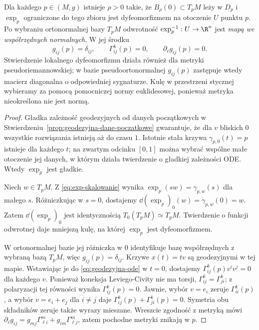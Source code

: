 \begin{twierdzenie}
\label{thm:wspolrzedne-normalne}
Dla każdego $p\in(M,g)$ istnieje $\rho>0$
takie, że $B_\rho(0)\subset T_pM$ leży w $D_p$
i $\exp_p$ ograniczone do tego zbioru jest
dyfeomorfizmem na otoczenie $U$ punktu $p$.
Po wybraniu ortonormalnej bazy $T_pM$
odwrotność $\exp_p^{-1}:U\to\R^n$ jest
\emph{mapą we współrzędnych normalnych}.
W jej środku
\begin{equation}\label{eq:normalne-metryka}
 g_{ij}(p)=\delta_{ij},\qquad
 \Gamma^k_{ij}(p)=0,\qquad
 \partial_\ell g_{ij}(p)=0.
\end{equation}
Stwierdzenie lokalnego dyfeomorfizmu działa
również dla metryki pseudoriemannowskiej;
w bazie pseudoortonormalnej $g_{ij}(p)$ zastępuje wtedy
macierz diagonalna o odpowiedniej sygnaturze. Kulę
w przestrzeni stycznej wybieramy za pomocą pomocniczej
normy euklidesowej, ponieważ metryka nieokreślona nie jest normą.
\end{twierdzenie}
\begin{proof}
Gładka zależność geodezyjnych od danych
początkowych w Stwierdzeniu~\ref{prop:geodezyjna-dane-poczatkowe}
gwarantuje, że dla $v$ bliskich $0$ wszystkie
rozwiązania istnieją aż do czasu $1$.
Istotnie stała krzywa $\gamma_{p,0}(t)=p$
istnieje dla każdego $t$; na zwartym odcinku
$[0,1]$ można wybrać wspólne małe otoczenie
jej danych, w którym działa twierdzenie o gładkiej
zależności ODE. Wtedy $\exp_p$ jest gładkie.

Niech $w\in T_pM$. Z \eqref{eq:exp-skalowanie}
wynika $\exp_p(sw)=\gamma_{p,w}(s)$ dla małego $s$.
Różniczkując w $s=0$, dostajemy
$\dd(\exp_p)_0(w)=\dot\gamma_{p,w}(0)=w$.
Zatem $\dd(\exp_p)_0$ jest identycznością
$T_0(T_pM)\simeq T_pM$. Twierdzenie o funkcji
odwrotnej daje mniejszą kulę, na której
$\exp_p$ jest dyfeomorfizmem.

W ortonormalnej bazie jej różniczka w $0$
identyfikuje bazę współrzędnych z wybraną bazą
$T_pM$, więc $g_{ij}(p)=\delta_{ij}$.
Krzywe $x(t)=tv$ są geodezyjnymi w tej mapie.
Wstawiając je do \eqref{eq:geodezyjna-ode}
w $t=0$, dostajemy
$\Gamma^k_{ij}(p)v^iv^j=0$ dla każdego $v$.
Ponieważ koneksja Leviego-Civity nie ma torsji,
$\Gamma^k_{ij}=\Gamma^k_{ji}$; z polaryzacji
tej równości wynika $\Gamma^k_{ij}(p)=0$.
Jawnie, wybór $v=e_i$ zeruje $\Gamma^k_{ii}(p)$,
a wybór $v=e_i+e_j$ dla $i\ne j$ daje
$\Gamma^k_{ij}(p)+\Gamma^k_{ji}(p)=0$.
Symetria obu składników zeruje także wyrazy mieszane.
Wreszcie zgodność z metryką mówi
$\partial_\ell g_{ij}
=g_{mj}\Gamma^m_{\ell i}
 +g_{im}\Gamma^m_{\ell j}$, zatem pochodne
metryki znikają w $p$.
\end{proof}

